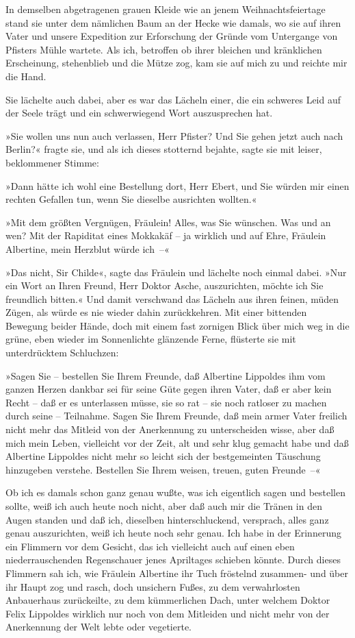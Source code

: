 In demselben abgetragenen grauen Kleide wie an jenem
Weihnachtsfeiertage stand sie unter dem nämlichen Baum an der Hecke
wie damals, wo sie auf ihren Vater und unsere Expedition zur
Erforschung der Gründe vom Untergange von Pfisters Mühle wartete.
Als ich, betroffen ob ihrer bleichen und kränklichen Erscheinung,
stehenblieb und die Mütze zog, kam sie auf mich zu und reichte mir
die Hand.

Sie lächelte auch dabei, aber es war das Lächeln einer, die ein
schweres Leid auf der Seele trägt und ein schwerwiegend Wort
auszusprechen hat.

»Sie wollen uns nun auch verlassen, Herr Pfister? Und Sie gehen
jetzt auch nach Berlin?« fragte sie, und als ich dieses stotternd
bejahte, sagte sie mit leiser, beklommener Stimme:

»Dann hätte ich wohl eine Bestellung dort, Herr Ebert, und Sie
würden mir einen rechten Gefallen tun, wenn Sie dieselbe ausrichten
wollten.«

»Mit dem größten Vergnügen, Fräulein! Alles, was Sie wünschen. Was
und an wen? Mit der Rapiditat eines Mokkakäf – ja wirklich und auf
Ehre, Fräulein Albertine, mein Herzblut würde ich~–«

»Das nicht, Sir Childe«, sagte das Fräulein und lächelte noch
einmal dabei. »Nur ein Wort an Ihren Freund, Herr Doktor Asche,
auszurichten, möchte ich Sie freundlich bitten.« Und damit
verschwand das Lächeln aus ihren feinen, müden Zügen, als würde es
nie wieder dahin zurückkehren. Mit einer bittenden Bewegung beider
Hände, doch mit einem fast zornigen Blick über mich weg in die
grüne, eben wieder im Sonnenlichte glänzende Ferne, flüsterte sie
mit unterdrücktem Schluchzen:

»Sagen Sie – bestellen Sie Ihrem Freunde, daß Albertine Lippoldes
ihm vom ganzen Herzen dankbar sei für seine Güte gegen ihren Vater,
daß er aber kein Recht – daß er es unterlassen müsse, sie so rat –
sie noch ratloser zu machen durch seine – Teilnahme. Sagen Sie
Ihrem Freunde, daß mein armer Vater freilich nicht mehr das Mitleid
von der Anerkennung zu unterscheiden wisse, aber daß mich mein
Leben, vielleicht vor der Zeit, alt und sehr klug gemacht habe und
daß Albertine Lippoldes nicht mehr so leicht sich der bestgemeinten
Täuschung hinzugeben verstehe. Bestellen Sie Ihrem weisen, treuen,
guten Freunde~–«

Ob ich es damals schon ganz genau wußte, was ich eigentlich sagen
und bestellen sollte, weiß ich auch heute noch nicht, aber daß auch
mir die Tränen in den Augen standen und daß ich, dieselben
hinterschluckend, versprach, alles ganz genau auszurichten, weiß
ich heute noch sehr genau. Ich habe in der Erinnerung ein Flimmern
vor dem Gesicht, das ich vielleicht auch auf einen eben
niederrauschenden Regenschauer jenes Apriltages schieben könnte.
Durch dieses Flimmern sah ich, wie Fräulein Albertine ihr Tuch
fröstelnd zusammen- und über ihr Haupt zog und rasch, doch
unsichern Fußes, zu dem verwahrlosten Anbauerhaus zurückeilte, zu
dem kümmerlichen Dach, unter welchem Doktor Felix Lippoldes
wirklich nur noch von dem Mitleiden und nicht mehr von der
Anerkennung der Welt lebte oder vegetierte.

